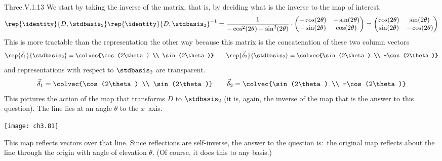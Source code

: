 \begin{ans}{Three.V.1.13}
      We start by taking
      the inverse of the matrix, that is, by deciding what is the inverse to
      the map of interest.
      \begin{equation*}
        \rep{\identity}{D,\stdbasis_2}
        \rep{\identity}{D,\stdbasis_2}^{-1}
        =\frac{1}{-\cos^2(2\theta)-\sin^2(2\theta)}\cdot\begin{pmatrix}
           -\cos(2\theta)   &-\sin(2\theta)  \\
           -\sin(2\theta)   &\cos(2\theta)
        \end{pmatrix}
        =\begin{pmatrix}
           \cos(2\theta)   &\sin(2\theta)  \\
           \sin(2\theta)   &-\cos(2\theta)
        \end{pmatrix}
      \end{equation*}
      This is more tractable than the representation the other way
      because this matrix is the concatenation of these two column vectors
      \begin{equation*}
        \rep{\vec{\delta}_1}{\stdbasis_2}
           =\colvec{\cos(2\theta) \\ \sin(2\theta)}
        \qquad
        \rep{\vec{\delta}_2}{\stdbasis_2}
           =\colvec{\sin(2\theta) \\ -\cos(2\theta)}
      \end{equation*}
      and representations with respect to $\stdbasis_2$ are transparent.
      \begin{equation*}
        \vec{\delta}_1=\colvec{\cos(2\theta) \\ \sin(2\theta)}
        \qquad
        \vec{\delta}_2=\colvec{\sin(2\theta) \\ -\cos(2\theta)}
      \end{equation*}
      This pictures the action of the map that transforms $D$ to $\stdbasis_2$
      (it is, again, the inverse of the map that is the answer to
      this question).
      The line lies at an angle $\theta$ to the $x$~axis.
      \begin{center}  \small
        \texttt{[image: ch3.81]}
      \end{center}
      This map reflects vectors over that line.
      Since reflections are self-inverse, the answer to the question is:~the
      original map reflects about the line
      through the origin with angle of elevation $\theta$.
      (Of course, it does this to any basis.)
    
\end{ans}
